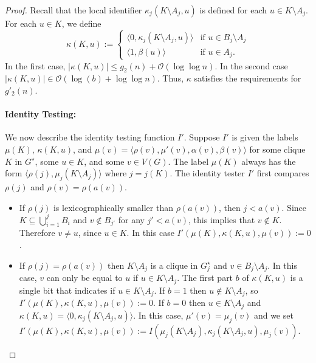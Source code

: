 \documentclass{patmorin}
\renewcommand{\le}{\leqslant}
\newcommand{\Oh}{\calO}
\newcommand{\calO}{\mathcal{O}}
\begin{document}
\begin{proof}
    Recall that the local identifier $\kappa_j(K\setminus A_j,u)$ is defined for each $u\in K\setminus A_j$.
    For each $u\in K$, we define
    \[
         \kappa(K,u):=
         \begin{cases}
           \langle 0,\kappa_j(K\setminus A_j,u)\rangle & \text{if $u\in B_j\setminus A_j$} \\
           \langle 1,\beta(u)\rangle & \text{if $u\in A_j$.}
         \end{cases}
     \]
     In the first case, $|\kappa(K,u)|\le g_2(n)+\Oh(\log\log n)$.
     In the second case $|\kappa(K,u)|\in \Oh(\log (b)+\log\log n)$.  Thus, $\kappa$ satisfies the requirements for $g'_2(n)$.


     \paragraph{Identity Testing:}
     We now describe the identity testing function $I'$.
     Suppose $I'$ is given the labels $\mu(K)$, $\kappa(K,u)$, and $\mu(v)=\langle \rho(v),\mu'(v),\alpha(v),\beta(v)\rangle$ for some clique $K$ in $G^\star$, some $u\in K$, and some $v\in V(G)$. The label $\mu(K)$ always has the form $\langle\rho(j),\mu_j(K\setminus A_j)\rangle$ where $j=j(K)$.     
     The identity tester $I'$ first compares $\rho(j)$ and $\rho(v)=\rho(a(v))$.
     \begin{itemize}
       \item If $\rho(j)$ is lexicographically smaller than $\rho(a(v))$, then $j<a(v)$.  Since $K\subseteq\bigcup_{i=1}^j B_i$ and $v\not\in B_{j'}$ for any $j'<a(v)$, this implies that $v\not\in K$.  Therefore $v\neq u$, since $u\in K$. In this case $I'(\mu(K),\kappa(K,u),\mu(v)):=0$.

       \item If $\rho(j)=\rho(a(v))$ then $K\setminus A_j$ is a clique in $G^\star_j$ and $v\in B_j\setminus A_j$.
       In this case, $v$ can only be equal to $u$ if $u\in K\setminus A_j$. 
       The first part $b$ of $\kappa(K,u)$ is a single bit that indicates if $u\in K\setminus A_j$.  If $b=1$ then $u\not\in K\setminus A_j$, so $I'(\mu(K),\kappa(K,u),\mu(v)):=0$.  If $b=0$ then $u\in K\setminus A_j$ and $\kappa(K,u)=\langle 0,\kappa_j(K\setminus A_j,u)\rangle$.  
       In this case, $\mu'(v)=\mu_j(v)$ and we set
       $I'(\mu(K),\kappa(K,u),\mu(v)):=I(\mu_j(K\setminus A_j),\kappa_j(K\setminus A_j,u),\mu_j(v))$.  


\end{itemize}
\end{proof}
\end{document}
